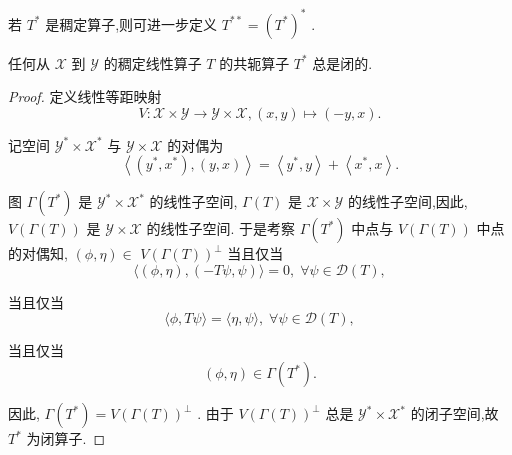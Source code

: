 \documentclass[lang=cn,newtx,10pt,scheme=chinese,thmcnt=chapter]{elegantbook}
\begin{document}
若 \({T}^{ * }\) 是稠定算子,则可进一步定义 \({T}^{* * } = {\left( {T}^{ * }\right) }^{ * }\) .
\begin{theorem}
    任何从 \(\mathcal{X}\) 到 \(\mathcal{Y}\) 的稠定线性算子 \(T\) 的共轭算子 \({T}^{ * }\) 总是闭的.
\end{theorem}
\begin{proof}
    定义线性等距映射
\begin{equation*}
V : \mathcal{X} \times  \mathcal{Y} \rightarrow  \mathcal{Y} \times  \mathcal{X},
\left( {x,y}\right)  \mapsto  \left( {-y,x}\right) .
\end{equation*}

记空间 \({\mathcal{Y}}^{ * } \times  {\mathcal{X}}^{ * }\) 与 \(\mathcal{Y} \times  \mathcal{X}\) 的对偶为
\begin{equation*}
\left\langle  {\left( {{y}^{ * },{x}^{ * }}\right) ,\left( {y,x}\right) }\right\rangle   = \left\langle  {{y}^{ * },y}\right\rangle   + \left\langle  {{x}^{ * },x}\right\rangle  .
\end{equation*}

图 \(\Gamma \left( {T}^{ * }\right)\) 是 \({\mathcal{Y}}^{ * } \times  {\mathcal{X}}^{ * }\) 的线性子空间, \(\Gamma \left( T\right)\) 是 \(\mathcal{X} \times  \mathcal{Y}\) 的线性子空间,因此, \(V\left( {\Gamma \left( T\right) }\right)\) 是 \(\mathcal{Y} \times  \mathcal{X}\) 的线性子空间. 于是考察 \(\Gamma \left( {T}^{ * }\right)\) 中点与 \(V\left( {\Gamma \left( T\right) }\right)\) 中点的对偶知, \(\left( {\phi ,\eta }\right)  \in\)  \(V{\left( \Gamma \left( T\right) \right) }^{ \bot  }\) 当且仅当
\begin{equation*}
\langle \left( {\phi ,\eta }\right) ,\left( {-{T\psi },\psi }\right) \rangle  = 0,\;\forall \psi  \in  \mathcal{D}(T) ,
\end{equation*}

当且仅当
\begin{equation*}
\langle \phi ,{T\psi }\rangle  = \langle \eta ,\psi \rangle ,\;\forall \psi  \in  \mathcal{D}(T) ,
\end{equation*}

当且仅当
\begin{equation*}
\left( {\phi ,\eta }\right)  \in  \Gamma \left( {T}^{ * }\right) .
\end{equation*}

因此, \(\Gamma \left( {T}^{ * }\right)  = V{\left( \Gamma \left( T\right) \right) }^{ \bot  }\) . 由于 \(V{\left( \Gamma \left( T\right) \right) }^{ \bot  }\) 总是 \({\mathcal{Y}}^{ * } \times  {\mathcal{X}}^{ * }\) 的闭子空间,故 \({T}^{ * }\) 为闭算子.
\end{proof}
\end{document}
